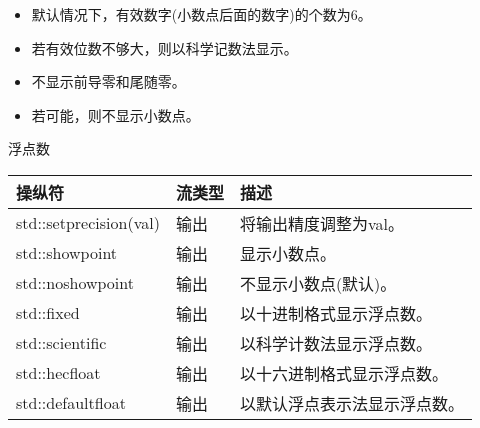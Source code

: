 \begin{itemize}
\item 
默认情况下，有效数字(小数点后面的数字)的个数为6。

\item 
若有效位数不够大，则以科学记数法显示。
 
\item 
不显示前导零和尾随零。

\item 
若可能，则不显示小数点。
\end{itemize}


\begin{center}
浮点数
\end{center}

\begin{longtable}[c]{|l|l|l|}
\hline
\textbf{操纵符}   & \textbf{流类型} & \textbf{描述}                                      \\ \hline
\endfirsthead
%
\endhead
%
std::setprecision(val) & 输出               & 将输出精度调整为val。               \\ \hline
std::showpoint         & 输出               & 显示小数点。                               \\ \hline
std::noshowpoint       & 输出               & 不显示小数点(默认)。               \\ \hline
std::fixed             & 输出               & 以十进制格式显示浮点数。     \\ \hline
std::scientific        & 输出               & 以科学计数法显示浮点数。  \\ \hline
std::hecfloat          & 输出               & 以十六进制格式显示浮点数。 \\ \hline
std::defaultfloat & 输出 & 以默认浮点表示法显示浮点数。 \\ \hline
\end{longtable}


